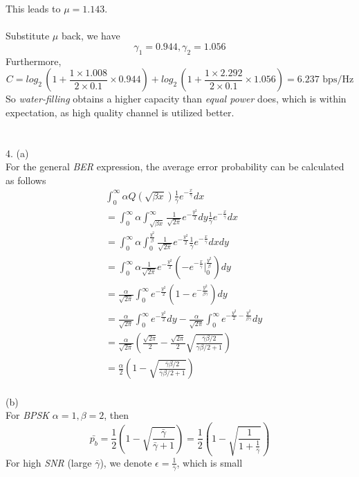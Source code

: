 \documentclass [12pt] {article}
\begin{document}
\begin{spacing}{1.5}
This leads to $\mu = 1.143$.\\
~\\
Substitute $\mu$ back, we have $$\gamma_1 =0.944, \gamma_2 = 1.056$$
Furthermore, $$ C = log_2 \, (1+ \frac{1\times 1.008}{2\times0.1}\times 0.944) +  log_2 \, (1+ \frac{1\times 2.292}{2\times0.1}\times 1.056) = 6.237 \text{ bps/Hz}$$
So \emph{water-filling} obtains a higher capacity than \emph{equal power} does, which is within expectation, as high quality channel is utilized better.  \\
~\\
\pagebreak
~\\
4. (a)\\
For the general \emph{BER} expression, the average error probability can be calculated as follows
\begin{align*}
&\int_0^\infty \alpha Q(\sqrt{\beta x}) \frac{1}{\bar\gamma}e^{-\frac{x}{\bar\gamma}}dx\\
& = \int_0^\infty \alpha \int_{\sqrt{\beta x}}^\infty \frac{1}{\sqrt{2\pi}}e^{-\frac{y^2}{2}}dy\frac{1}{\bar\gamma}e^{-\frac{x}{\bar\gamma}}dx\\
&= \int_0^\infty \alpha \int_0^{\frac{y^2}{\beta}}\frac{1}{\sqrt{2\pi}}e^{-\frac{y^2}{2}}\frac{1}{\bar\gamma}e^{-\frac{x}{\bar\gamma}}dxdy\\
&= \int_0^\infty \alpha \frac{1}{\sqrt{2\pi}}e^{-\frac{y^2}{2}}(-e^{-\frac{x}{\bar\gamma}}\big|_0^{\frac{y^2}{\beta}})dy\\
&= \frac{\alpha}{\sqrt{2\pi}}\int_0^\infty e^{-\frac{y^2}{2}}(1-e^{-\frac{y^2}{\beta \bar\gamma}})dy\\
& = \frac{\alpha}{\sqrt{2\pi}}\int_0^\infty e^{-\frac{y^2}{2}}dy - \frac{\alpha}{\sqrt{2\pi}}\int_0^\infty e^{-\frac{y^2}{2}-\frac{y^2}{\beta \bar\gamma}}dy\\
&=\frac{\alpha}{\sqrt{2\pi}}(\frac{\sqrt{2\pi}}{2} - \frac{\sqrt{2\pi}}{2}\sqrt{\frac{\bar\gamma\beta/2}{\bar\gamma\beta/2 +1}})\\
& = \frac{\alpha}{2}(1- \sqrt{\frac{\bar\gamma\beta/2}{\bar\gamma\beta/2 +1}})
\end{align*}
~\\
(b)\\
For \emph{BPSK} $\alpha = 1, \beta = 2$, then $$ \bar{p_b} = \frac{1}{2}(1-\sqrt{\frac{\bar\gamma}{\bar\gamma +1}}) = \frac{1}{2}(1-\sqrt{\frac{1}{1+\frac{1}{\bar\gamma}}})$$
For high \emph{SNR} (large $\bar\gamma$), we denote $\epsilon = \frac{1}{\bar\gamma}$, which is small\\
\begin{align*}

\end{align*}
\end{spacing}
\end{document}
